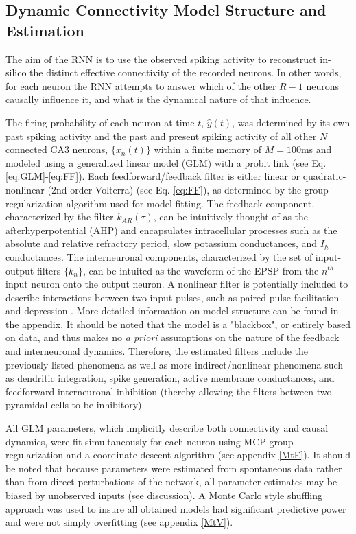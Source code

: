 \documentclass[11pt,a4paper,final]{article}
\begin{document}
\subsection{Dynamic Connectivity Model Structure and Estimation}

The aim of the RNN is to use the observed spiking activity to reconstruct in-silico the distinct effective connectivity of the \nn{} recorded neurons.
In other words, for each neuron the RNN attempts to answer which of the other $R-1$ neurons causally influence it, and what is the dynamical nature of that influence.

The firing probability of each neuron at time $t$, $\hat{y}(t)$, was determined by its own past spiking activity and the past and present spiking activity of all other $N$ connected CA3 neurons, $\{x_n(t)\}$ within a finite memory of $M=100$ms and modeled using a generalized linear model (GLM) with a probit link (see Eq. \ref{eq:GLM}-\ref{eq:FF}).
Each feedforward/feedback filter is either linear or quadratic-nonlinear (2nd order Volterra)  (see Eq. \ref{eq:FF}), as determined by the group regularization algorithm used for model fitting.
The feedback component, characterized by the filter $k_{AR}(\tau)$, can be intuitively thought of as the afterhyperpotential (AHP) \citep{spruston07} and encapsulates intracellular processes such as the absolute and relative refractory period, slow potassium conductances, and $I_h$ conductances.
The interneuronal components, characterized by the set of input-output filters $\{k_n\}$, can be intuited as the waveform of the EPSP from the $n^{th}$ input neuron onto the output neuron.
A nonlinear filter is potentially included to describe interactions between two input pulses, such as paired pulse facilitation and depression \citep{song09par1,sandler15}.
More detailed information on model structure can be found in the appendix. 
It should be noted that the model is a "blackbox", or entirely based on data, and thus makes no \textit{a priori} assumptions on the nature of the feedback and interneuronal dynamics.
Therefore, the estimated filters include the previously listed phenomena as well as more indirect/nonlinear phenomena such as dendritic integration, spike generation, active membrane conductances, and feedforward interneuronal inhibition (thereby allowing the filters between two pyramidal cells to be inhibitory).

All GLM parameters, which implicitly describe both connectivity and causal dynamics, were fit simultaneously for each neuron using MCP group regularization and a coordinate descent algorithm (see appendix \ref{MtE}).
It should be noted that because parameters were estimated from spontaneous data rather than from direct perturbations of the network, all parameter estimates may be biased by unobserved inputs (see discussion).
A Monte Carlo style shuffling approach was used to insure all obtained models had significant predictive power and were not simply overfitting (see appendix \ref{MtV}).
\end{document}
